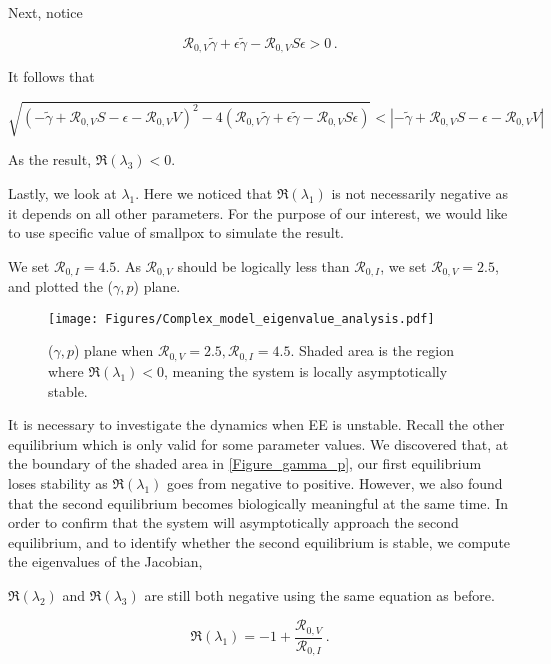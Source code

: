 \documentclass[12pt]{article}
\newcommand{\R}{\mathcal{R}}
\begin{document}
Next, notice
\begin{linenomath*}
\begin{equation}
\R_{0,V}\tilde{\gamma}+\epsilon\tilde{\gamma}-\R_{0,V}S\epsilon>0\,.
\end{equation}
\end{linenomath*}
It follows that
\begin{linenomath*}
\begin{equation}
\sqrt{(-\tilde{\gamma}+\R_{0,V} S-\epsilon-\R_{0,V}V)^2-4(\R_{0,V}\tilde{\gamma}+\epsilon\tilde{\gamma}-\R_{0,V}S\epsilon)}<|-\tilde{\gamma}+\R_{0,V} S-\epsilon-\R_{0,V}V|
\end{equation}
\end{linenomath*}
As the result, $\Re(\lambda_3)<0$.

Lastly, we look at $\lambda_1$. Here we noticed that $\Re(\lambda_1)$ is not necessarily negative as it depends on all other parameters. For the purpose of our interest, we would like to use specific value of smallpox to simulate the result.

We set $\R_{0,I}=4.5$. As $\R_{0,V}$ should be logically less than $\R_{0,I}$, we set $\R_{0,V}=2.5$, and plotted the ($\gamma,p$) plane.

\begin{figure}[H]
  \centering
  \texttt{[image: Figures/Complex\_model\_eigenvalue\_analysis.pdf]}
  \caption{($\gamma,p$) plane when $\R_{0,V}=2.5, \R_{0,I}=4.5$. Shaded area is the region where $\Re(\lambda_1)<0$, meaning the system is locally asymptotically stable.}
  \label{Figure_gamma_p}
\end{figure}

It is necessary to investigate the dynamics when EE is unstable. Recall the other equilibrium which is only valid for some parameter values. We discovered that, at the boundary of the shaded area in \autoref{Figure_gamma_p}, our first equilibrium loses stability as $\Re(\lambda_1)$ goes from negative to positive. However, we also found that the second equilibrium becomes biologically meaningful at the same time. In order to confirm that the system will asymptotically approach the second equilibrium, and to identify whether the second equilibrium is stable, we compute the eigenvalues of the Jacobian,

$\Re(\lambda_2)$ and $\Re(\lambda_3)$ are still both negative using the same equation as before.

\begin{equation}
\Re(\lambda_1)=-1+\frac{\R_{0,V}}{\R_{0,I}}\,.
\end{equation}
\end{document}
